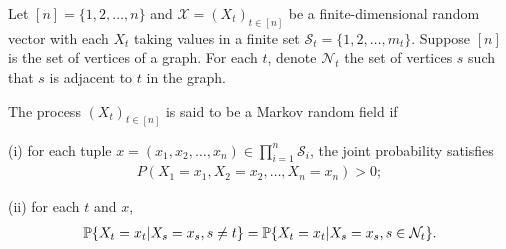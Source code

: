 Let $[n] = \{1,2,\dots,n\}$ and $\mathcal{X} = (X_t)_{t \in [n]}$ be a finite-dimensional random vector with each $X_t$ taking values in a finite set
$\mathcal{S}_t = \{1,2,\dots,m_t\}$. Suppose $[n]$ is the set of vertices of a
graph. For each $t$, denote $\mathcal{N}_t$ the set of vertices $s$ such that
$s$ is adjacent to $t$ in the graph.

\begin{definition} \label{def:MRF}
    The process $(X_t)_{t \in [n]}$ is said to be a Markov random field if

    (i) for each tuple $x = (x_1,x_2,\dots,x_n) \in \prod_{i=1}^n \mathcal{S}_i$, the joint probability satisfies
    \begin{align}
        P(X_1 = x_1, X_2 = x_2, \dots, X_n = x_n) >0;
    \end{align}

    (ii) for each $t$ and $x$,
    \begin{align}
        \mathbb{P} \{X_t = x_t | X_s = x_s, s \neq t\} = \mathbb{P} \{X_t = x_t | X_s = x_s, s \in \mathcal{N}_t \}.
    \end{align}
\end{definition}

